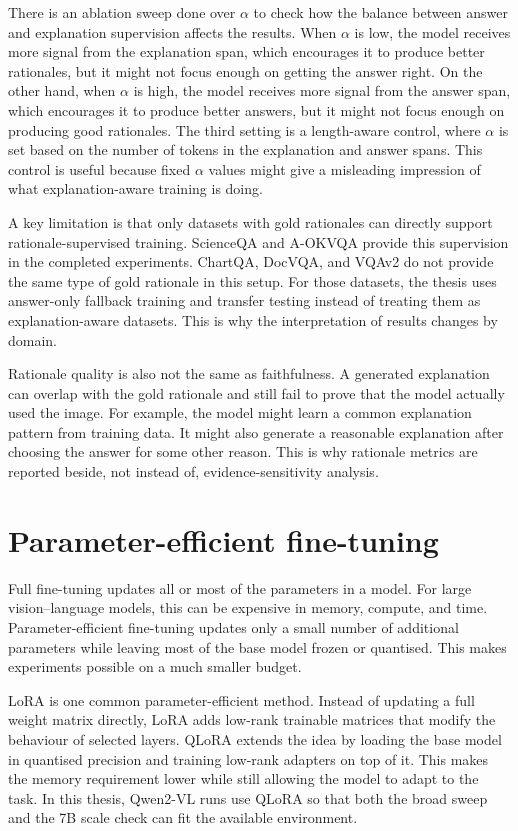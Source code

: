 There is an ablation sweep done over $\alpha$ to check how the balance between answer and explanation supervision affects the results.
When $\alpha$ is low, the model receives more signal from the explanation span,
which encourages it to produce better rationales, but it might not focus enough on getting the answer right.
On the other hand, when $\alpha$ is high, the model receives more signal from the answer span,
which encourages it to produce better answers, but it might not focus enough on producing good rationales.
The third setting is a length-aware control,
where $\alpha$ is set based on the number of tokens in the explanation and answer spans.
This control is useful because fixed $\alpha$ values might give a misleading impression of what explanation-aware training is doing.

A key limitation is that only datasets with gold rationales can directly support rationale-supervised training.
ScienceQA and A-OKVQA provide this supervision in the completed experiments.
ChartQA, DocVQA, and VQAv2 do not provide the same type of gold rationale in this setup.
For those datasets, the thesis uses answer-only fallback training and transfer testing instead of treating them as explanation-aware datasets.
This is why the interpretation of results changes by domain.

Rationale quality is also not the same as faithfulness.
A generated explanation can overlap with the gold rationale and still fail to prove that the model actually used the image.
For example, the model might learn a common explanation pattern from training data.
It might also generate a reasonable explanation after choosing the answer for some other reason.
This is why rationale metrics are reported beside, not instead of, evidence-sensitivity analysis.

\section{Parameter-efficient fine-tuning}
Full fine-tuning updates all or most of the parameters in a model.
For large vision--language models, this can be expensive in memory, compute, and time.
Parameter-efficient fine-tuning updates only a small number of additional parameters while leaving most of the base model frozen or quantised.
This makes experiments possible on a much smaller budget.

LoRA is one common parameter-efficient method.
Instead of updating a full weight matrix directly, LoRA adds low-rank trainable matrices that modify the behaviour of selected layers.
QLoRA extends the idea by loading the base model in quantised precision and training low-rank adapters on top of it.
This makes the memory requirement lower while still allowing the model to adapt to the task.
In this thesis, Qwen2-VL runs use QLoRA so that both the broad sweep and the 7B scale check can fit the available environment.

